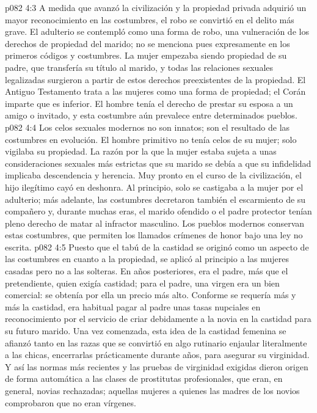 \vs p082 4:3 A medida que avanzó la civilización y la propiedad privada adquirió un mayor reconocimiento en las costumbres, el robo se convirtió en el delito más grave. El adulterio se contempló como una forma de robo, una vulneración de los derechos de propiedad del marido; no se menciona pues expresamente en los primeros códigos y costumbres. La mujer empezaba siendo propiedad de su padre, que transfería su título al marido, y todas las relaciones sexuales legalizadas surgieron a partir de estos derechos preexistentes de la propiedad. El Antiguo Testamento trata a las mujeres como una forma de propiedad; el Corán imparte que es inferior. El hombre tenía el derecho de prestar su esposa a un amigo o invitado, y esta costumbre aún prevalece entre determinados pueblos.
\vs p082 4:4 Los celos sexuales modernos no son innatos; son el resultado de las costumbres en evolución. El hombre primitivo no tenía celos de su mujer; solo vigilaba su propiedad. La razón por la que la mujer estaba sujeta a unas consideraciones sexuales más estrictas que su marido se debía a que su infidelidad implicaba descendencia y herencia. Muy pronto en el curso de la civilización, el hijo ilegítimo cayó en deshonra. Al principio, solo se castigaba a la mujer por el adulterio; más adelante, las costumbres decretaron también el escarmiento de su compañero y, durante muchas eras, el marido ofendido o el padre protector tenían pleno derecho de matar al infractor masculino. Los pueblos modernos conservan estas costumbres, que permiten los llamados crímenes de honor bajo una ley no escrita.
\vs p082 4:5 Puesto que el tabú de la castidad se originó como un aspecto de las costumbres en cuanto a la propiedad, se aplicó al principio a las mujeres casadas pero no a las solteras. En años posteriores, era el padre, más que el pretendiente, quien exigía castidad; para el padre, una virgen era un bien comercial: se obtenía por ella un precio más alto. Conforme se requería más y más la castidad, era habitual pagar al padre unas tasas nupciales en reconocimiento por el servicio de criar debidamente a la novia en la castidad para su futuro marido. Una vez comenzada, esta idea de la castidad femenina se afianzó tanto en las razas que se convirtió en algo rutinario enjaular literalmente a las chicas, encerrarlas prácticamente durante años, para asegurar su virginidad. Y así las normas más recientes y las pruebas de virginidad exigidas dieron origen de forma automática a las clases de prostitutas profesionales, que eran, en general, novias rechazadas; aquellas mujeres a quienes las madres de los novios comprobaron que no eran vírgenes.
